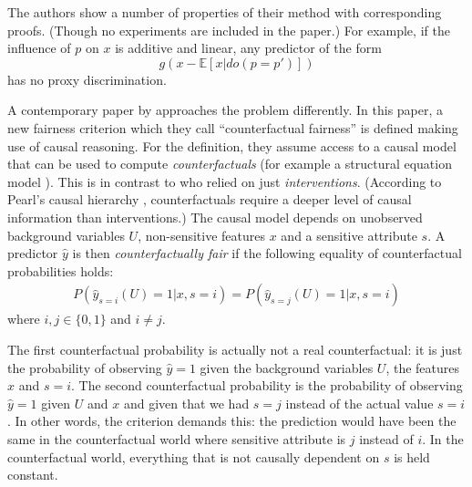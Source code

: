 The authors show a number of properties of their method with corresponding proofs.
(Though no experiments are included in the paper.)
For example, if the influence of \(p\) on \(x\) is additive and linear,
any predictor of the form \[g(x - \mathbb{E}[x|do(p=p')])\] has no proxy discrimination.


A contemporary paper by \citet{kusner2017counterfactual} approaches the problem differently.
In this paper, a new fairness criterion which they call ``counterfactual fairness''
is defined making use of causal reasoning.
For the definition, they assume access to a causal model
that can be used to compute \emph{counterfactuals} (for example a structural equation model \citep{kaplan2008structural}).
This is in contrast to \citet{kilbertus2017avoiding} who relied on just \emph{interventions}.
(According to Pearl's causal hierarchy \citep{pearl2019seven},
counterfactuals require a deeper level of causal information than interventions.)
The causal model depends on unobserved background variables \(U\),
non-sensitive features \(x\) and a sensitive attribute \(s\).
A predictor \(\hat{y}\) is then \emph{counterfactually fair}
if the following equality of counterfactual probabilities holds:
\begin{align}
  \label{eq:counterfactual-fairness}
  P(\hat{y}_{s=i}(U) = 1|x, s=i)=P(\hat{y}_{s=j}(U) = 1|x, s=i)
\end{align}
where \(i, j \in \{0, 1\}\) and \(i \neq j\).

The first counterfactual probability is actually not a real counterfactual:
it is just the probability of observing \(\hat{y} = 1\)
given the background variables \(U\), the features \(x\) and \(s=i\).
The second counterfactual probability is the probability of observing \(\hat{y} = 1\)
given \(U\) and \(x\) and given that we had \(s=j\) instead of the actual value \(s=i\).
In other words, the criterion demands this:
the prediction would have been the same in the counterfactual world
where sensitive attribute is \(j\) instead of \(i\).
In the counterfactual world, everything that is not causally dependent on \(s\) is held constant.

